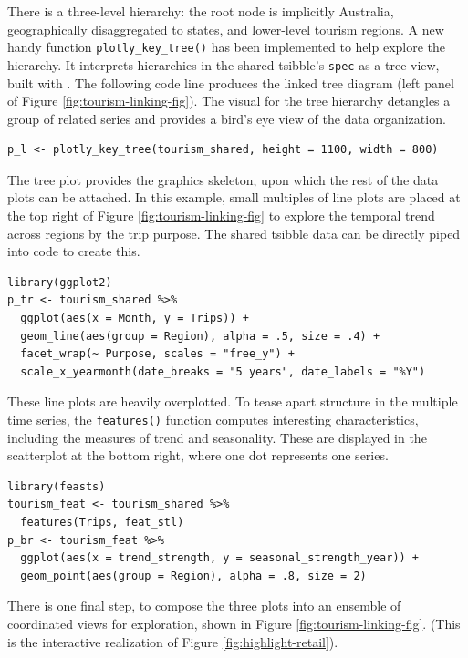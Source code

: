 \noindent There is a three-level hierarchy: the root node is implicitly Australia, geographically disaggregated to states, and lower-level tourism regions. A new handy function \texttt{plotly\_key\_tree()} has been implemented to help explore the hierarchy. It interprets hierarchies in the shared tsibble's \texttt{spec} as a tree view, built with . The following code line produces the linked tree diagram (left panel of Figure \ref{fig:tourism-linking-fig}). The visual for the tree hierarchy detangles a group of related series and provides a bird's eye view of the data organization.

\begin{verbatim}
p_l <- plotly_key_tree(tourism_shared, height = 1100, width = 800)
\end{verbatim}

The tree plot provides the graphics skeleton, upon which the rest of the data plots can be attached. In this example, small multiples of line plots are placed at the top right of Figure \ref{fig:tourism-linking-fig} to explore the temporal trend across regions by the trip purpose. The shared tsibble data can be directly piped into  code to create this.

\begin{verbatim}
library(ggplot2)
p_tr <- tourism_shared %>%
  ggplot(aes(x = Month, y = Trips)) +
  geom_line(aes(group = Region), alpha = .5, size = .4) +
  facet_wrap(~ Purpose, scales = "free_y") +
  scale_x_yearmonth(date_breaks = "5 years", date_labels = "%Y")
\end{verbatim}

These line plots are heavily overplotted. To tease apart structure in the multiple time series, the \texttt{features()} function computes interesting characteristics, including the measures of trend and seasonality. These are displayed in the scatterplot at the bottom right, where one dot represents one series.

\begin{verbatim}
library(feasts)
tourism_feat <- tourism_shared %>%
  features(Trips, feat_stl)
p_br <- tourism_feat %>%
  ggplot(aes(x = trend_strength, y = seasonal_strength_year)) +
  geom_point(aes(group = Region), alpha = .8, size = 2)
\end{verbatim}

There is one final step, to compose the three plots into an ensemble of coordinated views for exploration, shown in Figure \ref{fig:tourism-linking-fig}. (This is the interactive realization of Figure \ref{fig:highlight-retail}).


